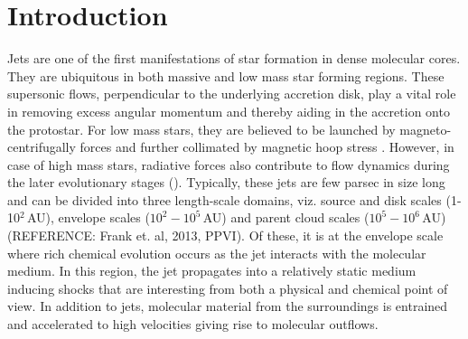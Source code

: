 \documentclass[useAMS,usenatbib]{mn2e}
\newcommand{\refer}{{\color{orange}REFERENCE}}
\begin{document}
%
%


\section{Introduction}
Jets are one of the first manifestations of star
formation in dense molecular cores. They are ubiquitous in both
massive and low mass star forming regions. These supersonic flows,
perpendicular to the underlying accretion disk, play a vital role in
removing excess angular momentum and thereby aiding in the accretion onto the protostar. 
For low mass stars, they are believed to be launched by magneto-centrifugally forces and
further collimated by magnetic hoop stress
\citep[][]{Blandford:1982p892, Konigl:2000p607}. However, in case of
high mass stars, radiative forces also contribute to flow dynamics
during the later evolutionary stages (\citealt{Vaidya:2011p8992}). 
Typically, these jets are few parsec in size long and can be divided into
three length-scale domains, viz. source and disk scales (1-10$^{2}\,$AU),
envelope scales ($10^{2} - 10^{5}$\,AU) and parent cloud scales
($10^{5} - 10^{6}$\,AU) (\refer : Frank et. al, 2013, PPVI). Of these, it is at the envelope scale where rich chemical evolution occurs as the jet interacts
with the molecular medium. In this region, the jet propagates into a
relatively static medium inducing shocks that are interesting from both a
physical and chemical point of view. In addition to jets, molecular
material from the surroundings is entrained and accelerated to high
velocities giving rise to molecular outflows.
%
\end{document}
